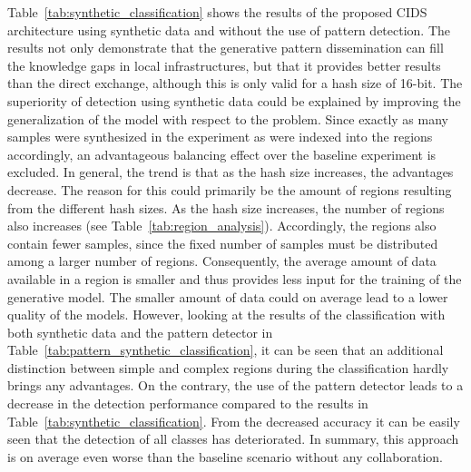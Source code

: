 \documentclass[../../main.tex]{subfiles}
\begin{document}
Table~\ref{tab:synthetic_classification} shows the results of the proposed CIDS architecture using synthetic data and without the use of pattern detection. The results not only demonstrate that the generative pattern dissemination can fill the knowledge gaps in local infrastructures, but that it provides better results than the direct exchange, although this is only valid for a hash size of 16-bit. The superiority of detection using synthetic data could be explained by improving the generalization of the model with respect to the problem. Since exactly as many samples were synthesized in the experiment as were indexed into the regions accordingly, an advantageous balancing effect over the baseline experiment is excluded. In general, the trend is that as the hash size increases, the advantages decrease. The reason for this could primarily be the amount of regions resulting from the different hash sizes. As the hash size increases, the number of regions also increases (see Table~\ref{tab:region_analysis}). Accordingly, the regions also contain fewer samples, since the fixed number of samples must be distributed among a larger number of regions. Consequently, the average amount of data available in a region is smaller and thus provides less input for the training of the generative model. The smaller amount of data could on average lead to a lower quality of the models. However, looking at the results of the classification with both synthetic data and the pattern detector in Table~\ref{tab:pattern_synthetic_classification}, it can be seen that an additional distinction between simple and complex regions during the classification hardly brings any advantages. On the contrary, the use of the pattern detector leads to a decrease in the detection performance compared to the results in Table~\ref{tab:synthetic_classification}. From the decreased accuracy it can be easily seen that the detection of all classes has deteriorated. In summary, this approach is on average even worse than the baseline scenario without any collaboration.
\end{document}

